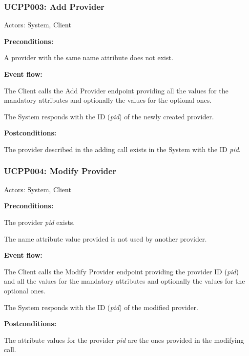 \begin{ucbox}{\subsubsection{UCPP003: Add Provider}}
\label{UCPP003}

Actors: System, Client

\textbf{Preconditions:}

\ucitem A provider with the same name attribute does not exist.

\textbf{Event flow:}

\ucitem The Client calls the Add Provider endpoint providing all the values for the mandatory attributes and optionally the values for the optional ones.

\ucitem The System responds with the ID (\textit{pid}) of the newly created provider.

\textbf{Postconditions:}

\ucitem The provider described in the adding call exists in the System with the ID \textit{pid}.

\end{ucbox}

\begin{ucbox}{\subsubsection{UCPP004: Modify Provider}}
\label{UCPP004}

Actors: System, Client

\textbf{Preconditions:}

\ucitem The provider \textit{pid} exists.

\ucitem The name attribute value provided is not used by another provider.

\textbf{Event flow:}

\ucitem The Client calls the Modify Provider endpoint providing the provider ID (\textit{pid}) and all the values for the mandatory attributes and optionally the values for the optional 
ones.

\ucitem The System responds with the ID (\textit{pid}) of the modified provider.

\textbf{Postconditions:}

\ucitem The attribute values for the provider \textit{pid} are the ones provided in the modifying call.

\end{ucbox}

